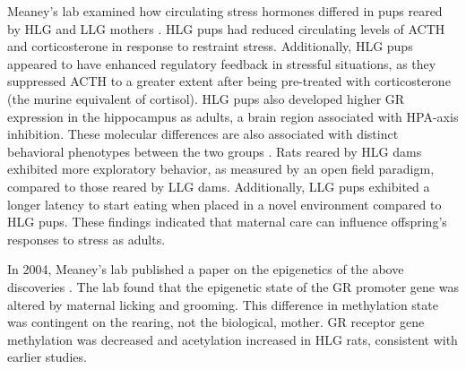 \documentclass[12pt,twoside]{reedthesis}
\begin{document}
Meaney's lab examined how circulating stress hormones differed in pups
reared by HLG and LLG mothers \citep{liu_maternal_2000}. HLG pups had reduced circulating levels of ACTH and
corticosterone in response to restraint stress. Additionally, HLG pups appeared
to have enhanced regulatory feedback in stressful situations, as they suppressed
ACTH to a greater extent after being pre-treated with corticosterone (the murine
equivalent of cortisol). HLG pups
also developed higher GR expression in the hippocampus as adults, a brain region
associated with HPA-axis inhibition. These molecular differences are also
associated with distinct behavioral phenotypes between the
two groups \citep{caldji_maternal_1998}. Rats reared by HLG dams exhibited more exploratory
behavior, as measured by an open field paradigm, compared to those reared by LLG
dams. Additionally, LLG pups exhibited a longer latency to start eating when
placed in a novel environment compared to HLG pups. These findings
indicated that maternal care can influence offspring's responses to stress as
adults.

In 2004, Meaney's lab
published a paper on the epigenetics of the above discoveries
\citep{weaver_epigenetic_2004}. The lab found that the
epigenetic state of the GR promoter gene was altered by maternal licking and
grooming. This difference in methylation state was contingent on the rearing,
not the biological, mother.  GR receptor gene methylation was decreased and
acetylation increased in HLG rats, consistent with earlier studies.
\end{document}
